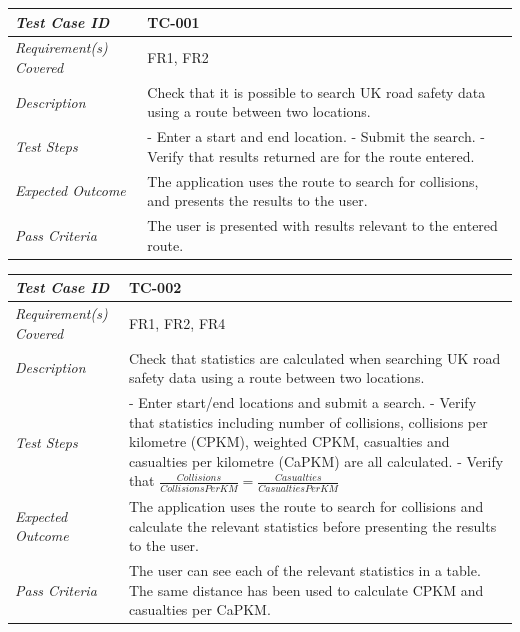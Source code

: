 \documentclass[authoryearcitations]{UoYCSproject}
\begin{document}
\begin{tabular}{| p{2.5cm} | p{11cm} |}
	\hline
	\textit{Test Case ID} & TC-001 \\ \hline
	\textit{Requirement(s) Covered} & FR1, FR2 \\ \hline
	\textit{Description} & Check that it is possible to search UK road safety data using a route between two locations.  \\ \hline
	\textit{Test Steps}& - Enter a start and end location.
	\newline - Submit the search.
	\newline - Verify that results returned are for the route entered.
 \\ \hline
	\textit{Expected Outcome} & The application uses the route to search for collisions, and presents the results to the user.  \\ \hline
	\textit{Pass Criteria} & The user is presented with results relevant to the entered route.  \\ \hline
\end{tabular}

\begin{tabular}{| p{2.5cm} | p{11cm} |}
	\hline
	\textit{Test Case ID} & TC-002 \\ \hline
	\textit{Requirement(s) Covered} & FR1, FR2, FR4 \\ \hline
	\textit{Description} & Check that statistics are calculated when searching UK road safety data using a route between two locations.  \\ \hline
	\textit{Test Steps}& - Enter start/end locations and submit a search.
	\newline - Verify that statistics including number of collisions, collisions per kilometre (CPKM), weighted CPKM, casualties and casualties per kilometre (CaPKM) are all calculated.
	\newline - Verify that $\frac{Collisions}{Collisions Per KM} = \frac{Casualties}{Casualties Per KM} $
 \\ \hline
	\textit{Expected Outcome} & The application uses the route to search for collisions and calculate the relevant statistics before presenting the results to the user.  \\ \hline
	\textit{Pass Criteria} & The user can see each of the relevant statistics in a table. The same distance has been used to calculate CPKM and casualties per CaPKM. \\ \hline
\end{tabular}
\end{document}
